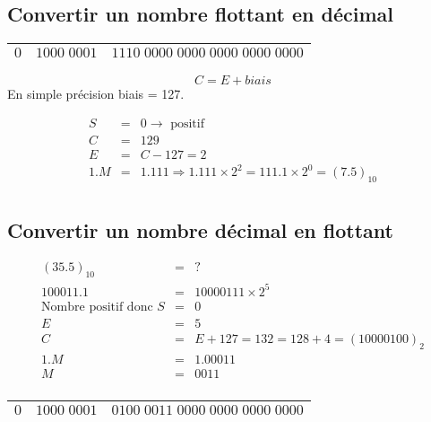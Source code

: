 \documentclass[12pt,a4paper,openany]{book}
\begin{document}
		\subsection{Convertir un nombre flottant en décimal}
		\begin{center}
			\begin{tabular}{|c|c|c|}
				\hline
				$0$ & $1000\; 0001$ & $1110\; 0000\; 0000\; 0000\; 0000\; 0000$\\
				\hline
			\end{tabular}
		\end{center}
	$$C = E + biais$$
	En simple précision biais = 127.

	\begin{eqnarray*}
		S &=& 0 \rightarrow \textrm{ positif}\\
		C &=& 129\\
		E &=& C - 127 = 2\\
		1.M &=& 1.111 \Rightarrow 1.111 \times 2^2 = 111.1 \times 2^0 = (7.5)_{10}\\
	\end{eqnarray*}
	\newpage	
	\subsection{Convertir un nombre décimal en flottant}
	\begin{eqnarray*}
		(35.5)_{10} &=& ? \\
		100011.1 &=& 10000111 \times 2^5\\
		\textrm{Nombre positif donc } S &=& 0\\
		E &=& 5\\
		C &=& E + 127 = 132 = 128+4 = (10000100)_2\\
		1.M &=& 1.00011\\
		M &=& 0011\\
	\end{eqnarray*}
	
		\begin{center}
			\begin{tabular}{|c|c|c|}
				\hline
				$0$ & $1000\; 0001$ & $0100\; 0011\; 0000\; 0000\; 0000\; 0000$\\
				\hline
			\end{tabular}
		\end{center}
		
\end{document}
